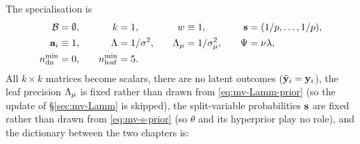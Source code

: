 The specialisation is
\begin{equation}
	\label{eq:subst}
	\begin{alignedat}{4}
		\mathcal{B} &= \emptyset,  & \qquad k     &= 1,             & \qquad w     &\equiv 1,      & \qquad \mathbf{s}  &= (1/p, \dots, 1/p), \\
		\mathbf{a}_i &\equiv 1,     & \qquad \Lambda &= 1/\sigma^{2},      & \qquad \Lambda_{\mu} &= 1/\sigma_\mu^{2},    & \qquad \Psi &= \nu\lambda, \\
		n^{\min}_{\mathrm{dn}} &= 0,        & \qquad n^{\min}_{\mathrm{leaf}} &= 5 .
	\end{alignedat}
\end{equation}
All $k \times k$ matrices become scalars, there are no latent outcomes
($\tilde{\mathbf{y}}_i = \mathbf{y}_i$), the leaf precision $\Lambda_{\mu}$ is fixed rather than drawn
from \eqref{eq:mv-Lamm-prior} (so the update of \S\ref{sec:mv-Lamm} is
skipped), the split-variable probabilities $\mathbf{s}$ are fixed rather than drawn
from \eqref{eq:mv-s-prior} (so $\theta$ and its hyperprior play no role),
and the dictionary between the two chapters is:
